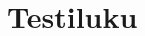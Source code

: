 \chapter{Testiluku}

\begin{kuvaajapohja}{2}{-3.14}{3.14}{-1.25}{1.25}
\end{kuvaajapohja}

\begin{kuvaajapohja}{2}{-3.14}{3.14}{-1.25}{1.25}
\end{kuvaajapohja}

\begin{lukusuora}{-1}{1}{10}
\end{lukusuora}

\begin{merkkikaavio}{5}

	\merkkikaavioMerkki{$+$}
	\merkkikaavioMerkki{$-$}
	\merkkikaavioMerkki{$-$}
	\merkkikaavioMerkki{$+$}
	\merkkikaavioMerkki{$-$}
	\merkkikaavioMerkki{$+$}
\merkkikaavioUusirivi
	\merkkikaavioMerkki{$+$}
	\merkkikaavioMerkki{$+$}
	\merkkikaavioMerkki{$-$}
	\merkkikaavioMerkki{$-$}
	\merkkikaavioMerkki{$+$}
	\merkkikaavioMerkki{$-$}
\merkkikaavioUusirivi
	\merkkikaavioMerkki{$-$}
	\merkkikaavioMerkki{$-$}
	\merkkikaavioMerkki{$-$}
	\merkkikaavioMerkki{$+$}
	\merkkikaavioMerkki{$-$}
	\merkkikaavioMerkki{$+$}
\merkkikaavioUusiriviKaksoisviiva
	\merkkikaavioMerkki{$+$}
	\merkkikaavioMerkki{$-$}
	\merkkikaavioMerkki{$+$}
	\merkkikaavioMerkki{$-$}
	\merkkikaavioMerkki{$+$}
	\merkkikaavioMerkki{$-$}
\end{merkkikaavio}
